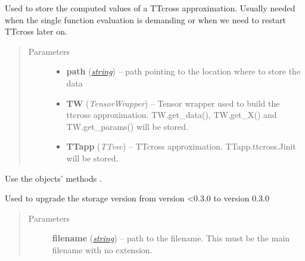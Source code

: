 \documentclass[a4paper,10pt,english]{sphinxmanual}
\begin{document}

\begin{fulllineitems}
\label{api-core:TensorToolbox.core.ttcross_store}
Used to store the computed values of a TTcross approximation. Usually needed when the single function evaluation is demanding or when we need to restart TTcross later on.
\begin{quote}\begin{description}
\item[{Parameters}] \leavevmode\begin{itemize}
\item {} 
\textbf{path} (\href{http://docs.python.org/library/string.html\#module-string}{\emph{string}}) -- path pointing to the location where to store the data

\item {} 
\textbf{TW} (\emph{TensorWrapper}) -- Tensor wrapper used to build the ttcross approximation. TW.get\_data(), TW.get\_X() and TW.get\_params() will be stored.

\item {} 
\textbf{TTapp} (\emph{TTvec}) -- TTcross approximation. TTapp.ttcross.Jinit will be stored.

\end{itemize}

\end{description}\end{quote}

Use the objects' methods .

\end{fulllineitems}


\begin{fulllineitems}
\label{api-core:TensorToolbox.core.to_v_0_3_0}
Used to upgrade the storage version from version \textless{}0.3.0 to version 0.3.0
\begin{quote}\begin{description}
\item[{Parameters}] \leavevmode
\textbf{filename} (\href{http://docs.python.org/library/string.html\#module-string}{\emph{string}}) -- path to the filename. This must be the main filename with no extension.

\end{description}\end{quote}

\end{fulllineitems}
\end{document}
